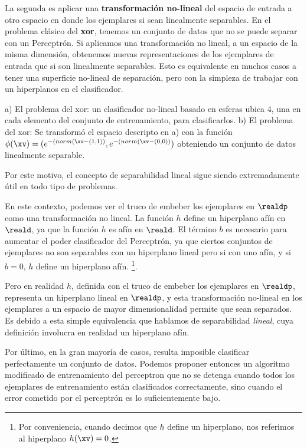 La segunda es aplicar una \textbf{transformación no-lineal} del espacio de entrada a otro espacio en donde los ejemplares si sean linealmente separables. En el problema clásico del \textbf{xor}, tenemos un conjunto de datos que no se puede separar con un Perceptrón. Si aplicamos una transformación no lineal, a un espacio de la misma dimensión, obtenemos nuevas representaciones de los ejemplares de entrada que si son linealmente separables. Esto es equivalente en muchos casos a tener una superficie no-lineal de separación, pero con la simpleza de trabajar con un hiperplanos en el clasificador.


a) El problema del xor: un clasificador no-lineal basado en esferas ubica 4, una en cada elemento del conjunto de entrenamiento, para clasificarlos. b) El problema del xor: Se transformó el espacio descripto en a) con la función $ \phi(\xv)= (e^{-( norm(\xv -(1,1))} , e^{-( norm(\xv-(0,0))} ) $ obteniendo un conjunto de datos linealmente separable.

Por este motivo, el concepto de separabilidad lineal sigue siendo extremadamente útil en todo tipo de problemas.

En este contexto, podemos ver el truco de embeber los ejemplares en $\realdp$ como una transformación no lineal. La función $h$ define un hiperplano afín en $\reald$, ya que la función $h$ es afín en $\reald$. El término $b$ es necesario para aumentar el poder clasificador del Perceptrón, ya que ciertos conjuntos de ejemplares no son separables con un hiperplano lineal pero si con uno afín, y si $b=0$, $h$ define un hiperplano afín. \footnote{Por conveniencia, cuando decimos que $h$ define un hiperplano, nos referimos al hiperplano $h(\xv)=0$.}.


Pero en realidad $h$, definida con el truco de embeber los ejemplares en $\realdp$, representa un hiperplano lineal en $\realdp$, y esta transformación no-lineal en los ejemplares a un espacio de mayor dimensionalidad permite que sean separados. Es debido a esta simple equivalencia que hablamos de separabilidad \textit{lineal}, cuya definición involucra en realidad un hiperplano afín.


Por último, en la gran mayoría de casos, resulta imposible clasificar perfectamente un conjunto de datos. Podemos proponer entonces un algoritmo modificado de entrenamiento del perceptron que no se detenga cuando todos los ejemplares de entrenamiento están clasificados correctamente, sino cuando el error cometido por el perceptrón es lo suficientemente bajo.

